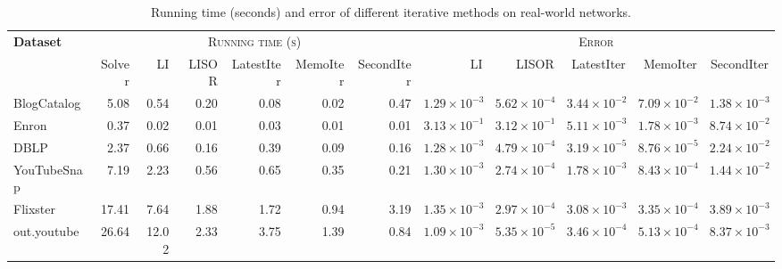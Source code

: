 \documentclass[sigconf,review, nonacm]{acmart}
\begin{document}
\begin{table}[t]
	\caption{Running time (seconds) and error of different iterative methods on real-world networks.}
	\label{tab:method-time-error}
	\centering
	\begin{adjustbox}{max width=\textwidth}
		\begin{tabular}{l rrrrrr rrrrr}
			\toprule
			\multirow{2}{*}{\textbf{Dataset}} &
			\multicolumn{6}{c}{\textsc{Running time (s)}} &
			\multicolumn{5}{c}{\textsc{Error}} \\
			\cmidrule(lr){2-7} \cmidrule(lr){8-12}
			& Solver & LI & LISOR & LatestIter & MemoIter & SecondIter
			& LI & LISOR & LatestIter & MemoIter & SecondIter \\
			\midrule
			BlogCatalog
			& 5.08 & 0.54 & 0.20 & 0.08 & 0.02 & 0.47
			& $1.29\times10^{-3}$ & $5.62\times10^{-4}$ & $3.44\times10^{-2}$ & $7.09\times10^{-2}$ & $1.38\times10^{-3}$ \\
			
			Enron
			& 0.37 & 0.02 & 0.01 & 0.03 & 0.01 & 0.01
			& $3.13\times10^{-1}$ & $3.12\times10^{-1}$ & $5.11\times10^{-3}$ & $1.78\times10^{-3}$ & $8.74\times10^{-2}$ \\
			
			DBLP
			& 2.37 & 0.66 & 0.16 & 0.39 & 0.09 & 0.16
			& $1.28\times10^{-3}$ & $4.79\times10^{-4}$ & $3.19\times10^{-5}$ & $8.76\times10^{-5}$ & $2.24\times10^{-2}$ \\
			
			YouTubeSnap
			& 7.19 & 2.23 & 0.56 & 0.65 & 0.35 & 0.21
			& $1.30\times10^{-3}$ & $2.74\times10^{-4}$ & $1.78\times10^{-3}$ & $8.43\times10^{-4}$ & $1.44\times10^{-2}$ \\
			
			Flixster
			& 17.41 & 7.64 & 1.88  & 1.72 & 0.94 & 3.19
			& $1.35\times10^{-3}$ & $2.97\times10^{-4}$ & $3.08\times10^{-3}$ & $3.35\times10^{-4}$ & $3.89\times10^{-3}$ \\
			
			out.youtube
			& 26.64 & 12.02 & 2.33  & 3.75 & 1.39 & 0.84
			& $1.09\times10^{-3}$ & $5.35\times10^{-5}$ & $3.46\times10^{-4}$ & $5.13\times10^{-4}$ & $8.37\times10^{-3}$ \\
			
			\bottomrule
		\end{tabular}
	\end{adjustbox}
\end{table}
\end{document}

